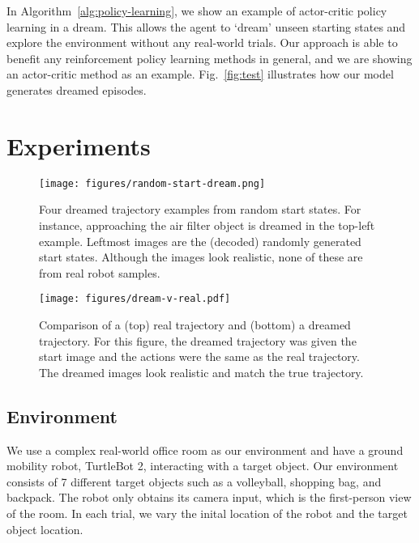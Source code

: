 \documentclass[letterpaper, 10 pt, conference]{ieeeconf}
\begin{document}
In Algorithm~\ref{alg:policy-learning}, we show an example of actor-critic policy learning in a dream.
This allows the agent to `dream' unseen starting states and explore the environment without any real-world trials. Our approach is able to benefit any reinforcement policy learning methods in general, and we are showing an actor-critic method as an example. Fig.~\ref{fig:test} illustrates how our model generates dreamed episodes.


\section{Experiments}
\label{sec:exp}
\begin{figure}
    \centering
      \texttt{[image: figures/random-start-dream.png]}
      \caption{Four dreamed trajectory examples from random start states. For instance, approaching the air filter object is dreamed in the top-left example. Leftmost images are the (decoded) randomly generated start states. Although the images look realistic, none of these are from real robot samples.
}
      \label{fig:rand-dream}
\end{figure}


\begin{figure}
    \centering
      \texttt{[image: figures/dream-v-real.pdf]}
      \caption{Comparison of a (top) real trajectory and (bottom) a dreamed trajectory. For this figure, the dreamed trajectory was given the start image and the actions were the same as the real trajectory. The dreamed images look realistic and match the true trajectory.}
      \label{fig:real-v-dream}
\end{figure}

\subsection{Environment}
We use a complex real-world office room as our environment and have a ground mobility robot, TurtleBot 2, interacting with a target object. Our environment consists of 7 different target objects such as a volleyball, shopping bag, and backpack. The robot only obtains its camera input, which is the first-person view of the room. In each trial, we vary the inital location of the robot and the target object location.
\end{document}
